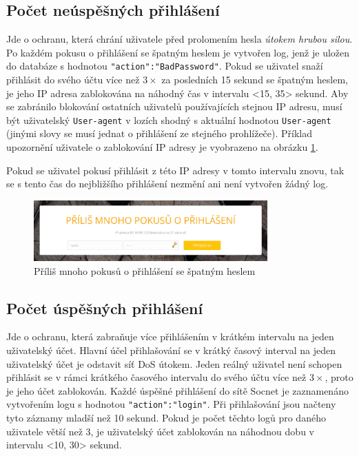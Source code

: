 \subsection*{Počet neúspěšných přihlášení}
Jde o ochranu, která chrání uživatele před prolomením hesla \textit{útokem hrubou silou}. Po každém pokusu o přihlášení se špatným heslem je vytvořen log, jenž je uložen do databáze s hodnotou \texttt{"action":"BadPassword"}. Pokud se uživatel snaží přihlásit do svého účtu více než $3\times$ za posledních 15 sekund se špatným heslem, je jeho IP adresa zablokována na náhodný čas v intervalu <15, 35> sekund. Aby se zabránilo blokování ostatních uživatelů používajících stejnou IP adresu, musí být uživatelský \texttt{User-agent} v lozích shodný s aktuální hodnotou \texttt{User-agent} (jinými slovy se musí jednat o přihlášení ze stejného prohlížeče). Příklad upozornění uživatele o zablokování IP adresy je vyobrazeno na obrázku \ref{img:blocked_IP}.

Pokud se uživatel pokusí přihlásit z této IP adresy v tomto intervalu znovu, tak se s tento čas do nejbližšího přihlášení nezmění ani není vytvořen žádný log. 

\begin{figure}[H]
	\centering
	\includegraphics[width=0.8\textwidth]{images/blocked_IP.jpg}
	\caption{Příliš mnoho pokusů o přihlášení se špatným heslem}
	\label{img:blocked_IP}
\end{figure}


\subsection*{Počet úspěšných přihlášení}
Jde o ochranu, která zabraňuje více přihlášením v krátkém intervalu na jeden uživatelský účet. Hlavní účel přihlašování se v krátký časový interval na jeden uživatelský účet je odstavit síť DoS útokem. Jeden reálný uživatel není schopen přihlásit se v rámci krátkého časového intervalu do svého účtu více než $3\times$, proto je jeho účet zablokován. Každé úspěšné přihlášení do sítě Socnet je zaznamenáno vytvořením logu s hodnotou \texttt{"action":"login"}. Při přihlašování jsou načteny tyto záznamy mladší než 10 sekund. Pokud je počet těchto logů pro daného uživatele větší než 3, je uživatelský účet zablokován na náhodnou dobu v intervalu <10, 30> sekund.

